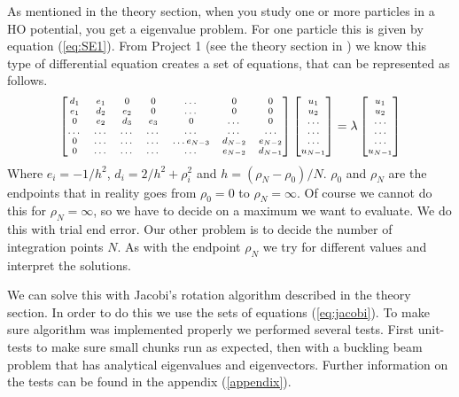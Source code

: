 \documentclass[reprint,english,notitlepage,nofootinbib]{revtex4-1}  %
\begin{document}
As mentioned in the theory section, when you study one or more particles in a HO potential, you get a eigenvalue problem. For one particle this is given by equation (\ref{eq:SE1}). From Project 1 (see the theory section in \citep{project1}) we know this type of differential equation creates a set of equations, that can be represented as follows.
\begin{equation}
	\label{eq:discrete_2nd_deriv_mat}
	\scriptsize{\begin{bmatrix}d_1 & e_1 & 0   & 0    & \dots  &0     & 0 \\
			e_1 & d_2 & e_2 & 0    & \dots  &0     &0 \\
			0   & e_2 & d_3 & e_3  &0       &\dots & 0\\
			\dots  & \dots & \dots & \dots  &\dots      &\dots & \dots\\
			0   & \dots & \dots & \dots  &\dots  e_{N-3}     &d_{N-2} & e_{N-2}\\
			0   & \dots & \dots & \dots  &\dots       &e_{N-2} & d_{N-1}
		\end{bmatrix}  \begin{bmatrix} u_{1} \\
			u_{2} \\
			\dots\\ \dots\\ \dots\\
			u_{N-1}
		\end{bmatrix}=\lambda \begin{bmatrix} u_{1} \\
			u_{2} \\
			\dots\\ \dots\\ \dots\\
			u_{N-1}
	\end{bmatrix}}
\end{equation}
Where $e_i = -1/h^2$, $d_i = 2/h^2 + \rho_i^2$ and $h = (\rho_N - \rho_0)/N$. $\rho_0$ and $\rho_N$ are the endpoints that in reality goes from $\rho_0 = 0$ to $\rho_N=\infty$. Of course we cannot do this for $\rho_N = \infty$, so we have to decide on a maximum we want to evaluate. We do this with trial end error. Our other problem is to decide the number of integration points $N$. As with the endpoint $\rho_N$ we try for different values and interpret the solutions.

We can solve this with Jacobi's rotation algorithm described in the theory section. In order to do this we use the sets of equations (\ref{eq:jacobi}). To make sure algorithm was implemented properly we performed several tests. First unit-tests to make sure small chunks run as expected, then with a buckling beam problem that has analytical eigenvalues and eigenvectors. Further information on the tests can be found in the appendix (\ref{appendix}).
\end{document}
